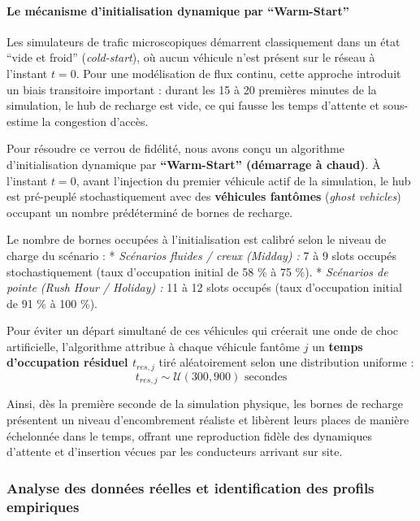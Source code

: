 \documentclass[10pt, a4paper]{article}
\begin{document}
\paragraph{Le mécanisme d'initialisation dynamique par
``Warm-Start''}\label{le-muxe9canisme-dinitialisation-dynamique-par-warm-start}

Les simulateurs de trafic microscopiques démarrent classiquement dans un
état ``vide et froid'' (\emph{cold-start}), où aucun véhicule n'est
présent sur le réseau à l'instant \(t = 0\). Pour une modélisation de
flux continu, cette approche introduit un biais transitoire important :
durant les 15 à 20 premières minutes de la simulation, le hub de
recharge est vide, ce qui fausse les temps d'attente et sous-estime la
congestion d'accès.

Pour résoudre ce verrou de fidélité, nous avons conçu un algorithme
d'initialisation dynamique par \textbf{``Warm-Start'' (démarrage à
chaud)}. À l'instant \(t=0\), avant l'injection du premier véhicule
actif de la simulation, le hub est pré-peuplé stochastiquement avec des
\textbf{véhicules fantômes} (\emph{ghost vehicles}) occupant un nombre
prédéterminé de bornes de recharge.

Le nombre de bornes occupées à l'initialisation est calibré selon le
niveau de charge du scénario : * \emph{Scénarios fluides / creux
(Midday) :} 7 à 9 slots occupés stochastiquement (taux d'occupation
initial de 58 \% à 75 \%). * \emph{Scénarios de pointe (Rush Hour /
Holiday) :} 11 à 12 slots occupés (taux d'occupation initial de 91 \% à
100 \%).

Pour éviter un départ simultané de ces véhicules qui créerait une onde
de choc artificielle, l'algorithme attribue à chaque véhicule fantôme
\(j\) un \textbf{temps d'occupation résiduel \(t_{res, j}\)} tiré
aléatoirement selon une distribution uniforme :
\[t_{res, j} \sim \mathcal{U}(300, 900) \text{ secondes}\]

Ainsi, dès la première seconde de la simulation physique, les bornes de
recharge présentent un niveau d'encombrement réaliste et libèrent leurs
places de manière échelonnée dans le temps, offrant une reproduction
fidèle des dynamiques d'attente et d'insertion vécues par les
conducteurs arrivant sur site.

\subsubsection{Analyse des données réelles et identification des profils
empiriques}\label{analyse-des-donnuxe9es-ruxe9elles-et-identification-des-profils-empiriques}
\end{document}
